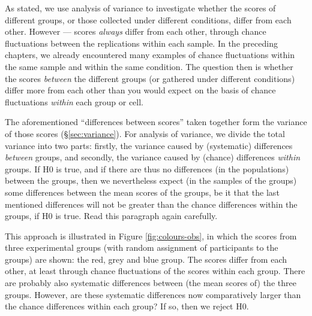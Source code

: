 \documentclass[
]{book}
\begin{document}
As stated, we use analysis of variance to investigate whether the
scores of different groups, or those collected under different conditions,
differ from each other. However --- scores \emph{always} differ
from each other, through chance fluctuations between the replications within
each sample. In the preceding chapters, we already encountered
many examples of chance fluctuations within the same sample and within
the same condition. The question then is whether the scores
\emph{between} the different groups (or gathered under different
conditions) differ more from each other than you would expect on the
basis of chance fluctuations \emph{within} each group or cell.

The aforementioned ``differences between scores'' taken together form the
variance of those scores
(§\ref{sec:variance}). For analysis of variance, we divide the total
variance into two parts: firstly, the variance caused by (systematic)
differences \emph{between} groups, and secondly, the variance caused
by (chance) differences \emph{within} groups. If H0 is true,
and if there are thus no differences (in the populations) between the
groups, then we nevertheless expect (in the samples of the groups)
some differences between the mean scores of the groups, be it that
the last mentioned differences will not be greater than
the chance differences within the groups, if H0 is true.
Read this paragraph again carefully.

This approach is illustrated in
Figure \ref{fig:colours-obs}, in which the scores from three experimental
groups (with random assignment of participants to the groups) are shown:
the red, grey and blue group. The scores differ from each other, at least
through chance fluctuations of the scores within
each group. There are probably also systematic differences between (the
mean scores of) the three groups. However, are these systematic
differences now comparatively larger than the chance differences within each
group? If so, then we reject H0.
\end{document}
